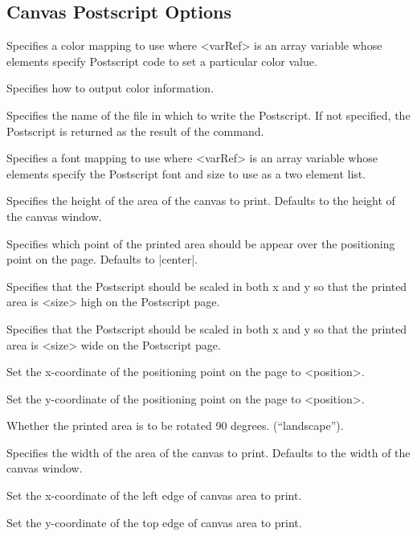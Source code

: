 \subsection*{Canvas Postscript Options}
\begin{enum}{1cm}

\vspace{-10pt}

Specifies a color mapping to use where <varRef> is an  array  variable
whose elements  specify Postscript  code to set a particular color value.

Specifies how to output color  information.

Specifies the name of the file in which  to  write the  Postscript.
If not specified, the Postscript is returned as the result of the command.

Specifies a font mapping to use where <varRef> is an  array  variable
whose elements  specify the Postscript font and size to use as a two element list.

Specifies the height of the area of the canvas to print.  Defaults to
the height of the canvas window.

Specifies which point of the printed  area  should be  appear  over the 
positioning point on the page. Defaults to |center|.

Specifies that the Postscript should be scaled in both x and y so that
the printed area is <size> high on the Postscript page.

Specifies that the Postscript should be scaled in both x and y so that
the printed area is <size> wide on the Postscript page.

Set the x-coordinate of the positioning point on the page to <position>.

Set the y-coordinate of the positioning point on the page to <position>.

Whether the printed area is to be rotated 90 degrees. (``landscape'').

Specifies the width of the area of the canvas to print.  Defaults to
the width of the canvas window.

Set the x-coordinate of the left edge of canvas area to print.

Set the y-coordinate of the top edge of canvas area to print.

\end{enum}

